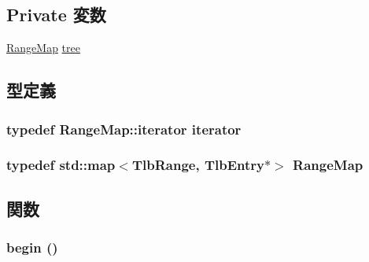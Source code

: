 \subsection*{Private 変数}
\begin{DoxyCompactItemize}
\item 
\hyperlink{classSparcISA_1_1TlbMap_a650c099a836955a5aafd619e38c1f69d}{RangeMap} \hyperlink{classSparcISA_1_1TlbMap_a3a72c569864f92e88af53d780f71ceac}{tree}
\end{DoxyCompactItemize}


\subsection{型定義}
\hypertarget{classSparcISA_1_1TlbMap_ae61c5513b9ac04615ba7927f47c3ec69}{
\subsubsection[{iterator}]{\setlength{\rightskip}{0pt plus 5cm}typedef RangeMap::iterator {\bf iterator}}}
\label{classSparcISA_1_1TlbMap_ae61c5513b9ac04615ba7927f47c3ec69}
\hypertarget{classSparcISA_1_1TlbMap_a650c099a836955a5aafd619e38c1f69d}{
\subsubsection[{RangeMap}]{\setlength{\rightskip}{0pt plus 5cm}typedef std::map$<${\bf TlbRange}, {\bf TlbEntry}$\ast$$>$ {\bf RangeMap}}}
\label{classSparcISA_1_1TlbMap_a650c099a836955a5aafd619e38c1f69d}


\subsection{関数}
\hypertarget{classSparcISA_1_1TlbMap_ad69bd11391be1a1dba5c8202259664f8}{
\subsubsection[{begin}]{ begin ()}}
\label{classSparcISA_1_1TlbMap_ad69bd11391be1a1dba5c8202259664f8}



